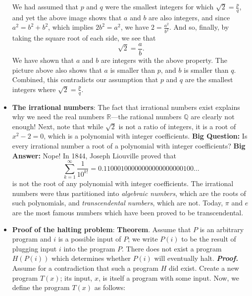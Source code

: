 \documentclass{report}
\begin{document}
\begin{itemize}
            \bigbreak \noindent 
            \bigbreak \noindent 
            We had assumed that $p$ and $q$ were the smallest integers for which $\sqrt{2} = \frac{p}{q}$, and yet the above image shows that $a$ and $b$ are also integers, and since $a^2 = b^2 + b^2$, which implies $2b^2 = a^2$, we have $2 = \frac{a^2}{b^2}$. And so, finally, by taking the square root of each side, we see that
            \[
                \sqrt{2} = \frac{a}{b}.
            \]
            We have shown that $a$ and $b$ are integers with the above property. The picture above also shows that $a$ is smaller than $p$, and $b$ is smaller than $q$. Combined, this contradicts our assumption that $p$ and $q$ are the smallest integers where $\sqrt{2} = \frac{p}{q}$.
        \item \textbf{The irrational numbers}:
            The fact that irrational numbers exist explains why we need the real numbers $\mathbb{R}$—the rational numbers $\mathbb{Q}$ are clearly not enough! Next, note that while $\sqrt{2}$ is not a ratio of integers, it is a root of $x^2 - 2 = 0$, which is a polynomial with integer coefficients.
            \bigbreak \noindent 
            \textbf{Big Question:} Is every irrational number a root of a polynomial with integer coefficients? 
            \bigbreak \noindent 
            \textbf{Big Answer:} Nope! In 1844, Joseph Liouville proved that
            \[
                \sum_{k=1}^\infty \frac{1}{10^{k!}} = 0.11000100000000000000000100\ldots
            \]
            is not the root of any polynomial with integer coefficients.
            \bigbreak \noindent 
            The irrational numbers were thus partitioned into \textit{algebraic numbers}, which are the roots of such polynomials, and \textit{transcendental numbers}, which are not. Today, $\pi$ and $e$ are the most famous numbers which have been proved to be transcendental.
        \item \textbf{Proof of the halting problem}:
            \bigbreak \noindent 
            \textbf{Theorem}. Assume that $P$ is an arbitrary program and $i$ is a possible input of $P$; we write $P(i)$ to be the result of plugging input $i$ into the program $P$. There does not exist a program $H(P(i))$ which determines whether $P(i)$ will eventually halt.
            \bigbreak \noindent 
            \textbf{\textit{Proof.}} Assume for a contradiction that such a program $H$ did exist. Create a new program $T(x)$; its input, $x$, is itself a program with some input. Now, we define the program $T(x)$ as follows:

\end{itemize}
\end{document}
